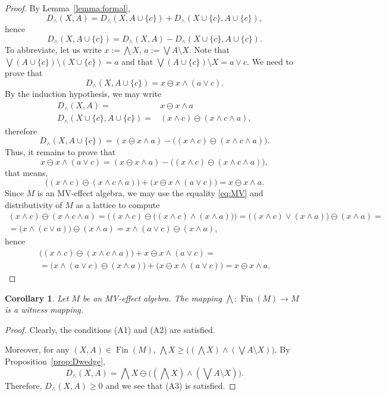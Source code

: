 \documentclass[letterpaper]{amsart}
\newtheorem{corollary}{Corollary}
\theoremstyle{definition}
\DeclareMathOperator*\Fin{Fin}
\begin{document}
\begin{proof}
By Lemma~\ref{lemma:formal},
$$
D_\wedge(X,A)=D_\wedge(X,A\cup\{c\})+D_\wedge(X\cup\{c\},A\cup\{c\}),
$$
hence
$$
D_\wedge(X,A\cup\{c\})=D_\wedge(X,A)-D_\wedge(X\cup\{c\},A\cup\{c\}).
$$
To abbreviate, let us write
$x:=\bigwedge X$, $a:=\bigvee A\setminus X$.
Note that $\bigvee (A\cup\{c\})\setminus(X\cup\{c\})=a$ and that
$\bigvee (A\cup\{c\})\setminus X=a\vee c$.
We need to prove that
$$
D_\wedge(X,A\cup\{c\})=x\ominus x\wedge(a\vee c).
$$
By the induction hypothesis, we may write
\begin{align*}
D_\wedge(X,A)=&x\ominus x\wedge a\\
D_\wedge(X\cup\{c\},A\cup\{c\})=&(x\wedge c)\ominus (x\wedge c\wedge a),
\end{align*}
therefore
$$
D_\wedge(X,A\cup\{c\})=
	(x\ominus x\wedge a)-\bigl((x\wedge c)\ominus (x\wedge c\wedge a)\bigr).
$$
Thus, it remains to prove that
$$
x\ominus x\wedge(a\vee c)=
	(x\ominus x\wedge a)-\bigl((x\wedge c)\ominus (x\wedge c\wedge a)\bigr),
$$
that means,
$$
\bigl((x\wedge c)\ominus (x\wedge c\wedge a)\bigr)+\bigl(x\ominus x\wedge(a\vee c)\bigr)=x\ominus x\wedge a.
$$
Since $M$ is an MV-effect algebra, we may use the 
equality \ref{eq:MV} and distributivity of $M$ as a lattice to compute
\begin{align*}
(x\wedge c)\ominus (x\wedge c\wedge a)=
\bigl((x\wedge c)\ominus \bigl((x\wedge c)\wedge (x\wedge a)\bigr)\bigr)=
\bigl((x\wedge c)\vee(x\wedge a)\bigr)\ominus(x\wedge a)=\\
=\bigl(x\wedge(c\vee a)\bigr)\ominus (x\wedge a)=
x\wedge(a\vee c)\ominus (x\wedge a),
\end{align*}
hence
\begin{align*}
\bigl((x\wedge c)\ominus (x\wedge c\wedge a)\bigr)+x\ominus x\wedge(a\vee c)=\\
=\bigl(x\wedge(a\vee c)\ominus (x\wedge a)\bigr)+\bigl(x\ominus x\wedge(a\vee c)\bigr)=
x\ominus x\wedge a.
\end{align*}
\end{proof}

\begin{corollary}\label{coro:wedgeiscm}
Let $M$ be an MV-effect algebra. The mapping $\bigwedge:\Fin(M)\to M$ is
a witness mapping.
\end{corollary}
\begin{proof}
Clearly, the conditions (A1) and (A2) are satisfied.

Moreover, for any $(X,A)\in\Fin(M)$, 
$\bigwedge X\geq \bigl((\bigwedge X)\wedge(\bigvee A\setminus X)\bigr)$.
By Proposition~\ref{prop:Dwedge},
$$
D_\wedge(X,A)=\bigwedge X\ominus\bigl((\bigwedge X)\wedge(\bigvee A\setminus X)\bigr).
$$
Therefore, $D_\wedge(X,A)\geq 0$ and we see that (A3) is satisfied.
\end{proof}
\end{document}
